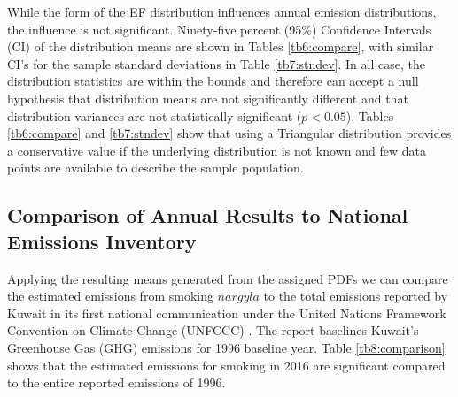 %
\begin{table}[H]
\centering
\caption{Comparison of annual total emission standard deviations.}
\label{tb7:stndev}
\end{table}

While the form of the EF distribution influences annual emission distributions, the influence is not significant. Ninety-five percent (95\%) Confidence Intervals (CI) of the distribution means are shown in Tables \ref{tb6:compare}, with similar CI’s for the sample standard deviations in Table \ref{tb7:stndev}. In all case, the distribution statistics are within the bounds and therefore can accept a null hypothesis that distribution means are not significantly different and that distribution variances are not statistically significant ($p<0.05$).  Tables \ref{tb6:compare} and \ref{tb7:stndev} show that using a Triangular distribution provides a conservative value if the underlying distribution is not known and few data points are available to describe the sample population.  

\subsection{Comparison of Annual Results to National Emissions Inventory}
Applying the resulting means generated from the assigned PDFs we can compare the estimated emissions from smoking $nargyla$ to the total emissions reported by Kuwait in its first national communication under the United Nations Framework Convention on Climate Change (UNFCCC) \citep{AlMudhhi2012}.  The report baselines Kuwait’s Greenhouse Gas (GHG) emissions for 1996 baseline year.  Table \ref{tb8:comparison} shows that the estimated emissions for smoking in 2016 are significant compared to the entire reported emissions of 1996. 

